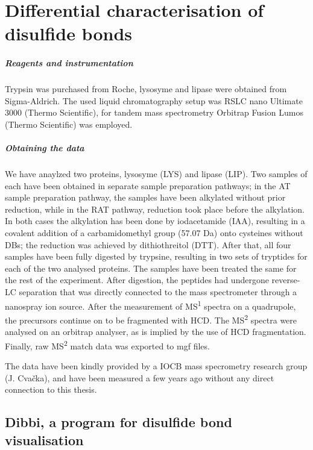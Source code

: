 \chapter{Differential characterisation of disulfide bonds}\label{chap:methods}

\paragraph{Reagents and instrumentation} Trypsin was purchased from Roche, lysosyme and lipase were obtained from Sigma-Aldrich. The used liquid chromatography setup was RSLC nano Ultimate 3000 (Thermo Scientific), for tandem mass spectrometry Orbitrap Fusion Lumos (Thermo Scientific) was employed.

\paragraph{Obtaining the data} We have anaylzed two proteins, lysosyme (LYS) and lipase (LIP). Two samples of each have been obtained in separate sample preparation pathways; in the AT sample preparation pathway, the samples have been alkylated without prior reduction, while in the RAT pathway, reduction took place before the alkylation. In both cases the alkylation has been done by iodacetamide (IAA), resulting in a covalent addition of a carbamidomethyl group (57.07 Da) onto cysteines without DBs; the reduction was achieved by dithiothreitol (DTT). After that, all four samples have been fully digested by trypsine, resulting in two sets of tryptides for each of the two analysed proteins. The samples have been treated the same for the rest of the experiment. After digestion, the peptides had undergone reverse-LC separation that was directly connected to the mass spectrometer through a nanospray ion source. After the measurement of MS\textsuperscript{1} spectra on a quadrupole, the precursors continue on to be fragmented with HCD\@. The MS\textsuperscript{2} spectra were analysed on an orbitrap analyser, as is implied by the use of HCD fragmentation. Finally, raw MS\textsuperscript{2} match data was exported to mgf files.

The data have been kindly provided by a IOCB mass specrometry research group (J. Cvačka), and have been measured a few years ago without any direct connection to this thesis.

\section{Dibbi, a program for disulfide bond visualisation}

